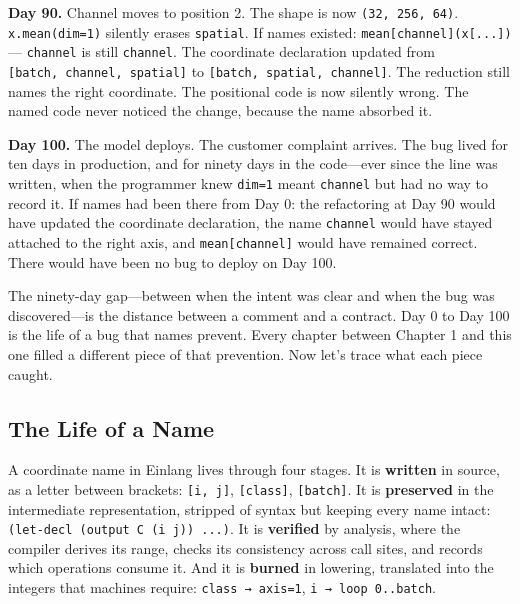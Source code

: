 \documentclass[11pt,titlepage]{article}
\begin{document}
\textbf{Day 90.} Channel moves to position 2. The shape is now
\texttt{(32,\ 256,\ 64)}. \texttt{x.mean(dim=1)} silently erases
\texttt{spatial}. If names existed:
\texttt{mean{[}channel{]}(x{[}...{]})} --- \texttt{channel} is still
\texttt{channel}. The coordinate declaration updated from
\texttt{{[}batch,\ channel,\ spatial{]}} to
\texttt{{[}batch,\ spatial,\ channel{]}}. The reduction still names the
right coordinate. The positional code is now silently wrong. The named
code never noticed the change, because the name absorbed it.

\textbf{Day 100.} The model deploys. The customer complaint arrives. The
bug lived for ten days in production, and for ninety days in the
code---ever since the line was written, when the programmer knew
\texttt{dim=1} meant \texttt{channel} but had no way to record it. If
names had been there from Day 0: the refactoring at Day 90 would have
updated the coordinate declaration, the name \texttt{channel} would have
stayed attached to the right axis, and \texttt{mean{[}channel{]}} would
have remained correct. There would have been no bug to deploy on Day
100.

The ninety-day gap---between when the intent was clear and when the bug
was discovered---is the distance between a comment and a contract. Day 0
to Day 100 is the life of a bug that names prevent. Every chapter
between Chapter 1 and this one filled a different piece of that
prevention. Now let's trace what each piece caught.

\vspace{2em}

\hypertarget{the-life-of-a-name}{%
\subsection{The Life of a Name}\label{the-life-of-a-name}}

A coordinate name in Einlang lives through four stages. It is
\textbf{written} in source, as a letter between brackets:
\texttt{{[}i,\ j{]}}, \texttt{{[}class{]}}, \texttt{{[}batch{]}}. It is
\textbf{preserved} in the intermediate representation, stripped of
syntax but keeping every name intact:
\texttt{(let-decl\ (output\ C\ (i\ j))\ ...)}. It is \textbf{verified}
by analysis, where the compiler derives its range, checks its
consistency across call sites, and records which operations consume it.
And it is \textbf{burned} in lowering, translated into the integers that
machines require: \texttt{class\ →\ axis=1},
\texttt{i\ →\ loop\ 0..batch}.
\end{document}
